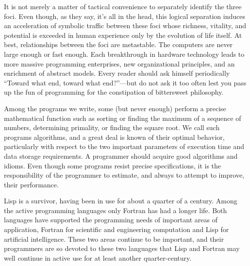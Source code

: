 It is not merely a matter of tactical convenience to separately identify the
three foci.  Even though, as they say, it's all in the head, this logical
separation induces an acceleration of symbolic traffic between these foci whose
richness, vitality, and potential is exceeded in human experience only by the
evolution of life itself.  At best, relationships between the foci are
metastable.  The computers are never large enough or fast enough.  Each
breakthrough in hardware technology leads to more massive programming
enterprises, new organizational principles, and an enrichment of abstract
models.  Every reader should ask himself periodically ``Toward what end, toward
what end?''---but do not ask it too often lest you pass up the fun of
programming for the constipation of bittersweet philosophy.

Among the programs we write, some (but never enough) perform a precise
mathematical function such as sorting or finding the maximum of a sequence of
numbers, determining primality, or finding the square root.  We call such
programs algorithms, and a great deal is known of their optimal behavior,
particularly with respect to the two important parameters of execution time and
data storage requirements.  A programmer should acquire good algorithms and
idioms.  Even though some programs resist precise specifications, it is the
responsibility of the programmer to estimate, and always to attempt to improve,
their performance.

Lisp is a survivor, having been in use for about a quarter of a century.  Among
the active programming languages only Fortran has had a longer life.  Both
languages have supported the programming needs of important areas of
application, Fortran for scientific and engineering computation and Lisp for
artificial intelligence.  These two areas continue to be important, and their
programmers are so devoted to these two languages that Lisp and Fortran may
well continue in active use for at least another quarter-century.


